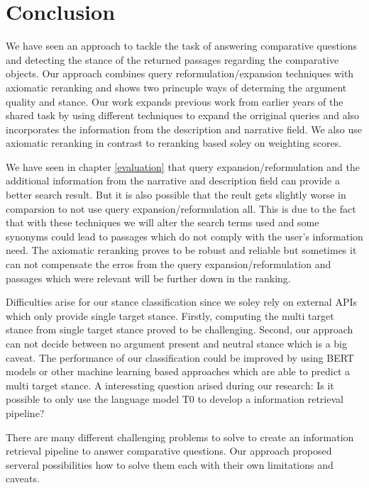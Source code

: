 \section{Conclusion}
    We have seen an approach to tackle the task of answering comparative questions and detecting the stance of the returned passages regarding the comparative objects. Our approach combines query reformulation/expansion techniques with axiomatic reranking and shows two princuple ways of determing the argument quality and stance. Our work expands previous work from earlier years of the shared task by using different techniques to expand the orriginal queries and also incorporates the information from the description and narrative field. We also use axiomatic reranking in contrast to reranking based soley on weighting scores.\par
    We have seen in chapter \ref{evaluation} that query expansion/reformulation and the additional information from the narrative and description field can provide a better search result. But it is also possible that the reult gets slightly worse in comparsion to not use query expansion/reformulation all. This is due to the fact that with these techniques we will alter the search terms used and some synonyms could lead to passages which do not comply with the user's information need. The axiomatic reranking proves to be robust and reliable but sometimes it can not compensate the erros from the query expansion/reformulation and passages which were relevant will be further down in the ranking.\par 
    Difficulties arise for our stance classification since we soley rely on external APIs which only provide single target stance. Firstly, computing the multi target stance from single target stance proved to be challenging. Second, our approach can not decide between no argument present and neutral stance which is a big caveat. The performance of our classification could be improved by using BERT models or other machine learning based approaches which are able to predict a multi target stance. A interessting question arised during our research: Is it possible to only use the language model T0 to develop a information retrieval pipeline?\par
    There are many different challenging problems to solve to create an information retrieval pipeline to answer comparative questions. Our approach proposed serveral possibilities how to solve them each with their own limitations and caveats.    